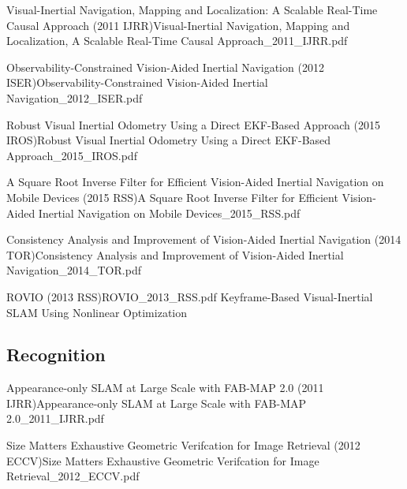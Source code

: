\documentclass[10pt,a4paper]{scrartcl}
\begin{document}
\begin{multicols*}{2}
\begin{Paper}{Visual-Inertial Navigation, Mapping and Localization: A Scalable Real-Time Causal Approach (2011 IJRR)}{Visual-Inertial Navigation, Mapping and Localization, A Scalable Real-Time Causal Approach_2011_IJRR.pdf}
\end{Paper}

\begin{Paper}{Observability-Constrained Vision-Aided Inertial Navigation (2012 ISER)}{Observability-Constrained Vision-Aided Inertial Navigation_2012_ISER.pdf}
\end{Paper}

\begin{Paper}{Robust Visual Inertial Odometry Using a Direct EKF-Based Approach (2015 IROS)}{Robust Visual Inertial Odometry Using a Direct EKF-Based Approach_2015_IROS.pdf}
\end{Paper}

\begin{Paper}{A Square Root Inverse Filter for Efficient Vision-Aided Inertial Navigation on Mobile Devices (2015 RSS)}{A Square Root Inverse Filter for Efficient Vision-Aided Inertial Navigation on Mobile Devices_2015_RSS.pdf}
\end{Paper}

\begin{Paper}{Consistency Analysis and Improvement of Vision-Aided Inertial Navigation (2014 TOR)}{Consistency Analysis and Improvement of Vision-Aided Inertial Navigation_2014_TOR.pdf}
\end{Paper}

\begin{Paper}{ROVIO (2013 RSS)}{ROVIO_2013_RSS.pdf}
Keyframe-Based Visual-Inertial SLAM Using Nonlinear Optimization
\end{Paper}

\subsection{Recognition}

\begin{Paper}{Appearance-only SLAM at Large Scale with FAB-MAP 2.0 (2011 IJRR)}{Appearance-only SLAM at Large Scale with FAB-MAP 2.0_2011_IJRR.pdf}
\end{Paper}

\begin{Paper}{Size Matters Exhaustive Geometric Verifcation for Image Retrieval (2012 ECCV)}{Size Matters Exhaustive Geometric Verifcation for Image Retrieval_2012_ECCV.pdf}
\end{Paper}


\end{multicols*}
\end{document}
